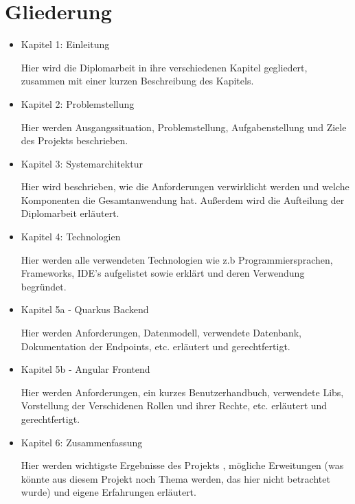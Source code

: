 \section{Gliederung}

\begin{itemize}
    \item  Kapitel 1: Einleitung
    
    Hier wird die Diplomarbeit in ihre verschiedenen Kapitel gegliedert, zusammen mit einer kurzen Beschreibung des Kapitels.
    
    \item  Kapitel 2: Problemstellung
    
    Hier werden Ausgangssituation, Problemstellung, Aufgabenstellung und Ziele des Projekts beschrieben.
    
    \item  Kapitel 3: Systemarchitektur
    
    Hier wird beschrieben, wie die Anforderungen verwirklicht werden und welche Komponenten die Gesamtanwendung hat. 
    Außerdem wird die Aufteilung der Diplomarbeit erläutert.

    \item  Kapitel 4: Technologien
    
    Hier werden alle verwendeten Technologien wie z.b Programmiersprachen, Frameworks, IDE's aufgelistet sowie erklärt und deren Verwendung begründet.
    
    \item  Kapitel 5a - Quarkus Backend
    
    Hier werden Anforderungen, Datenmodell, verwendete Datenbank, Dokumentation der Endpoints, etc. erläutert und gerechtfertigt.
    
    \item  Kapitel 5b - Angular Frontend
    
    Hier werden Anforderungen, ein kurzes Benutzerhandbuch, verwendete Libs, Vorstellung der Verschidenen Rollen und ihrer Rechte, etc. erläutert und gerechtfertigt.
    
    \item  Kapitel 6: Zusammenfassung
    
    Hier werden wichtigste Ergebnisse des Projekts , mögliche Erweitungen (was könnte aus diesem Projekt noch Thema werden, 
    das hier nicht betrachtet wurde) und eigene Erfahrungen erläutert.
\end{itemize}